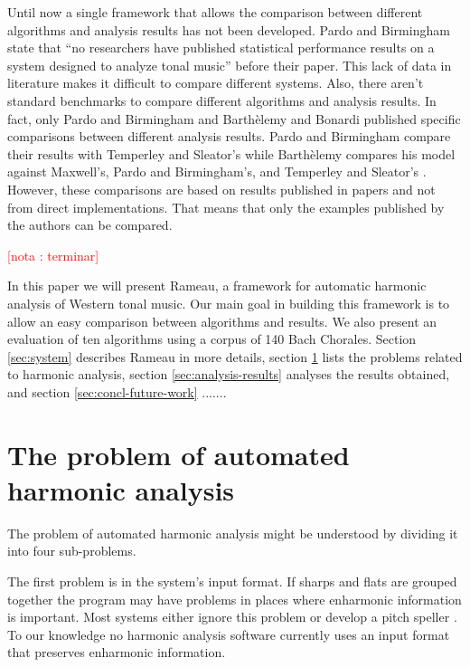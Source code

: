 \documentclass{article}
\newcounter{notacounter}
\newcommand{\nota}[1]{
  \addtocounter{notacounter}{1}
  \textcolor{red}{[nota \arabic{notacounter}: #1]}
}
\begin{document}
Until now a single framework that allows the comparison between
different algorithms and analysis results has not been developed.
Pardo and Birmingham state that ``no researchers have published
statistical performance results on a system designed to analyze tonal
music'' \cite{pardo02:algorithms} before their paper. This lack of
data in literature makes it difficult to compare different systems.
Also, there aren't standard benchmarks to compare different algorithms
and analysis results. In fact, only Pardo and Birmingham
\cite{pardo00:automated} and Barthèlemy and Bonardi
\cite{barthelemy01:figured} published specific comparisons between
different analysis results. Pardo and Birmingham compare their results
with Temperley and Sleator's \cite{temperley99:modeling} while
Barthèlemy compares his model against Maxwell's, Pardo and
Birmingham's, and Temperley and Sleator's
\cite{maxwell92:expert,temperley96:algorithm,pardo99:automated}.
However, these comparisons are based on results published in papers
and not from direct implementations. That means that only the examples
published by the authors can be compared.

\nota{terminar}
In this paper we will present Rameau, a framework for automatic
harmonic analysis of Western tonal music. Our main goal in building
this framework is to allow an easy comparison between algorithms and
results. We also present an evaluation of ten algorithms using a
corpus of 140 Bach Chorales. Section \ref{sec:system} describes Rameau
in more details, section \ref{sec:problem} lists the problems related
to harmonic analysis, section \ref{sec:analysis-results} analyses the
results obtained, and section \ref{sec:concl-future-work} .......

\section{The problem of automated harmonic analysis}
\label{sec:problem}

The problem of automated harmonic analysis might be understood by
dividing it into four sub-problems. 

The first problem is in the system's input format. If sharps and flats
are grouped together the program may have problems in places where
enharmonic information is important. Most systems either ignore this
problem or develop a pitch speller \cite{temperley99:modeling}. To our
knowledge no harmonic analysis software currently uses an input format
that preserves enharmonic information.
\end{document}
